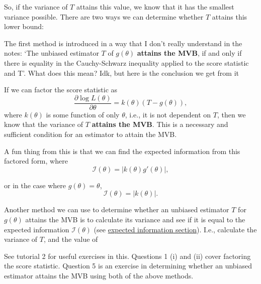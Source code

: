 So, if the variance of \(T\) attains this value, we know that it has the smallest variance possible. 
There are two ways we can determine whether \(T\) attains this lower bound:

\bigskip

The first method is introduced in a way that I don't really understand in the notes:
`The unbiased estimator \(T\) of \(g(\theta)\) \textbf{attains the MVB}, if and only if there is equality in the 
Cauchy-Schwarz inequality applied to the score statistic and T'.
What does this mean? Idk, but here is the conclusion we get from it

\begin{theorem}\label{thm:factoring score stat}
    If we can factor the score statistic as 
    \begin{equation}\label{eq:factoring score statistic}
        \frac{\partial \log L(\theta)}{\partial \theta} = k(\theta)(T-g(\theta)),
    \end{equation}
    where \(k(\theta)\) is some function of only \(\theta\), i.e., it is not dependent on \(T\), then we know that the variance of \(T\) \textbf{attains the MVB}.
    This is a necessary and sufficient condition for an estimator to attain the MVB\@.
\end{theorem}

A fun thing from this is that we can find the expected information from this factored form, where 
\begin{equation}\label{eq:expected info from factored score stat function theta}
    \mathscr{I}(\theta) = |k(\theta)g'(\theta)|,
\end{equation}

or in the case where \(g(\theta)=\theta\), 
\begin{equation}\label{eq:expected info from factored score stat scalar theta}
    \mathscr{I}(\theta) = |k(\theta)|.
\end{equation}


\bigskip

Another method we can use to determine whether an unbiased estimator \(T\) for \(g(\theta)\) attains the MVB is to calculate its variance and see if it is equal to the expected information \(\mathscr{I}(\theta)\) (see \hyperref[defn:expected information sing]{expected information section}). 
I.e., calculate the variance of \(T\), and the value of 

\begin{exercise}
    See tutorial 2 for useful exercises in this. Questions 1 (i) and (ii) cover factoring the score statistic. 
    Question 5 is an exercise in determining whether an unbiased estimator attains the MVB using both of the above methods.  
\end{exercise}

